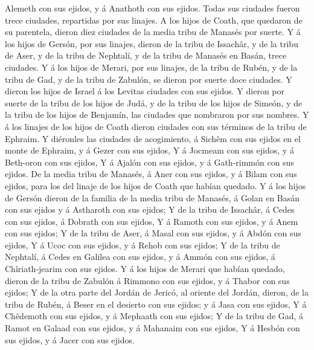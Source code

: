Alemeth con sus ejidos, y á Anathoth con sus ejidos. Todas sus ciudades
fueron trece ciudades, repartidas por sus linajes.  A los
hijos de Coath, que quedaron de su parentela, dieron diez ciudades de la
media tribu de Manasés por suerte.  Y á los hijos de
Gersón, por sus linajes, dieron de la tribu de Issachâr, y de la tribu
de Aser, y de la tribu de Nephtalí, y de la tribu de Manasés en Basán,
trece ciudades.  Y á los hijos de Merari, por sus
linajes, de la tribu de Rubén, y de la tribu de Gad, y de la tribu de
Zabulón, se dieron por suerte doce ciudades.  Y dieron
los hijos de Israel á los Levitas ciudades con sus ejidos.
 Y dieron por suerte de la tribu de los hijos de Judá, y
de la tribu de los hijos de Simeón, y de la tribu de los hijos de
Benjamín, las ciudades que nombraron por sus nombres.  Y
á los linajes de los hijos de Coath dieron ciudades con sus términos de
la tribu de Ephraim.  Y diéronles las ciudades de
acogimiento, á Sichêm con sus ejidos en el monte de Ephraim, y á Gezer
con sus ejidos,  Y á Jocmeam con sus ejidos, y á
Beth-oron con sus ejidos,  Y á Ajalón con sus ejidos, y á
Gath-rimmón con sus ejidos.  De la media tribu de
Manasés, á Aner con sus ejidos, y á Bilam con sus ejidos, para los del
linaje de los hijos de Coath que habían quedado.  Y á los
hijos de Gersón dieron de la familia de la media tribu de Manasés, á
Golan en Basán con sus ejidos y á Astharoth con sus ejidos;
 Y de la tribu de Issachâr, á Cedes con sus ejidos, á
Dobrath con sus ejidos,  Y á Ramoth con sus ejidos, y á
Anem con sus ejidos;  Y de la tribu de Aser, á Masal con
sus ejidos, y á Abdón con sus ejidos,  Y á Ucoc con sus
ejidos, y á Rehob con sus ejidos;  Y de la tribu de
Nephtalí, á Cedes en Galilea con sus ejidos, y á Ammón con sus ejidos, á
Chîriath-jearim con sus ejidos.  Y á los hijos de Merari
que habían quedado, dieron de la tribu de Zabulón á Rimmono con sus
ejidos, y á Thabor con sus ejidos;  Y de la otra parte
del Jordán de Jericó, al oriente del Jordán, dieron, de la tribu de
Rubén, á Beser en el desierto con sus ejidos; y á Jasa con sus ejidos,
 Y á Chêdemoth con sus ejidos, y á Mephaath con sus
ejidos;  Y de la tribu de Gad, á Ramot en Galaad con sus
ejidos, y á Mahanaim con sus ejidos,  Y á Hesbón con sus
ejidos, y á Jacer con sus ejidos.

